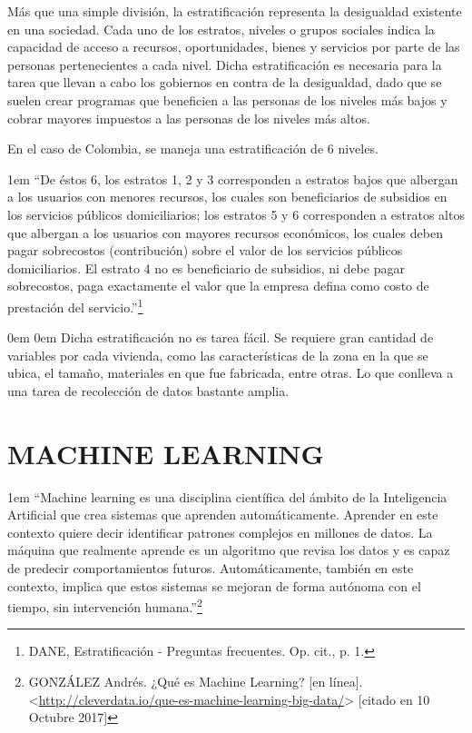     Más que una simple división, la estratificación representa la desigualdad existente en una sociedad. Cada uno de los estratos, niveles o grupos sociales indica la capacidad de acceso a recursos, oportunidades, bienes y servicios por parte de las personas pertenecientes a cada nivel. Dicha estratificación es necesaria para la tarea que llevan a cabo los gobiernos en contra de la desigualdad, dado que se suelen crear programas que beneficien a las personas de los niveles más bajos y cobrar mayores impuestos a las personas de los niveles más altos.
    
    En el caso de Colombia, se maneja una estratificación de 6 niveles.

	\leftskip1em
	\rightskip\leftskip
	{\footnotesize \hspace{\parindent} “De éstos 6, los estratos 1, 2 y 3 corresponden a estratos bajos que albergan a los usuarios con menores recursos, los cuales son beneficiarios de subsidios en los servicios públicos domiciliarios; los estratos 5 y 6 corresponden a estratos altos que albergan a los usuarios con mayores recursos económicos, los cuales deben pagar sobrecostos (contribución) sobre el valor de los servicios públicos domiciliarios. El estrato 4 no es beneficiario de subsidios, ni debe pagar sobrecostos, paga exactamente el valor que la empresa defina como costo de prestación del servicio.”\footnote[9]{DANE, Estratificación - Preguntas frecuentes. Op. cit., p. 1.}}
	
	\leftskip0em
	\rightskip0em
    Dicha estratificación no es tarea fácil. Se requiere gran cantidad de variables por cada vivienda, como las características de la zona en la que se ubica, el tamaño, materiales en que fue fabricada, entre otras. Lo que conlleva a una tarea de recolección de datos bastante amplia.
    
    
    \section{MACHINE LEARNING}
    
    \leftskip1em
    \rightskip\leftskip
    {\footnotesize \hspace{\parindent}
    “Machine learning es una disciplina científica del ámbito de la Inteligencia Artificial que crea sistemas que aprenden automáticamente. Aprender en este contexto quiere decir identificar patrones complejos en millones de datos. La máquina que realmente aprende es un algoritmo que revisa los datos y es capaz de predecir comportamientos futuros. Automáticamente, también en este contexto, implica que estos sistemas se mejoran de forma autónoma con el tiempo, sin intervención humana.”\footnote[10]{GONZÁLEZ  Andrés. ¿Qué es Machine Learning? [en línea]. <\url{http://cleverdata.io/que-es-machine-learning-big-data/}> [citado en 10 Octubre 2017]}}

